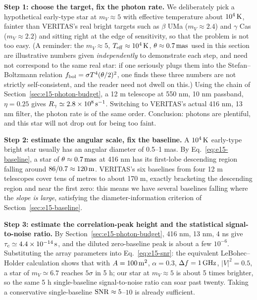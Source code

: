 \textbf{Step 1: choose the target, fix the photon rate.} We deliberately pick a hypothetical early-type star at $m_V\approx5$ with effective temperature about $10^4\,{\rm K}$, fainter than VERITAS's real bright targets such as $\beta$ UMa ($m_V\approx2.4$) and $\gamma$ Cas ($m_V\approx2.2$) and sitting right at the edge of sensitivity, so that the problem is not too easy. (A reminder: the $m_V\approx5$, $T_{\rm eff}\approx10^4\,{\rm K}$, $\theta\approx0.7\,{\rm mas}$ used in this section are illustrative numbers given \emph{independently} to demonstrate each step, and need not correspond to the same real star: if one seriously plugs them into the Stefan--Boltzmann relation $f_{\rm bol}=\sigma T^4(\theta/2)^2$, one finds these three numbers are not strictly self-consistent, and the reader need not dwell on this.) Using the chain of Section~\ref{sec:e15-photon-budget}, a 12 m telescope at 550 nm, 10 nm passband, $\eta=0.25$ gives $R_\gamma\simeq2.8\times10^8\,{\rm s^{-1}}$. Switching to VERITAS's actual 416 nm, 13 nm filter, the photon rate is of the same order. Conclusion: photons are plentiful, and this star will not drop out for being too faint.

\textbf{Step 2: estimate the angular scale, fix the baseline.} A $10^4\,{\rm K}$ early-type bright star usually has an angular diameter of 0.5--1 mas. By Eq.~\eqref{eq:e15-baseline}, a star of $\theta\approx0.7\,{\rm mas}$ at 416 nm has its first-lobe descending region falling around $86/0.7\approx120\,{\rm m}$. VERITAS's six baselines from four 12 m telescopes cover tens of metres to about 170 m, exactly bracketing the descending region and near the first zero: this means we have several baselines falling where the \emph{slope is large}, satisfying the diameter-information criterion of Section~\ref{sec:e15-baseline}.

\textbf{Step 3: estimate the correlation-peak height and the statistical signal-to-noise ratio.} By Section~\ref{sec:e15-photon-budget}, 416 nm, 13 nm, 4 ns give $\tau_c\simeq4.4\times10^{-14}\,{\rm s}$, and the diluted zero-baseline peak is about a few $10^{-6}$. Substituting the array parameters into Eq.~\eqref{eq:e15-snr}: the equivalent LeBohec--Holder calculation shows that with $A=100\,{\rm m^2}$, $\alpha=0.3$, $\Delta f=1\,{\rm GHz}$, $|V|^2=0.5$, a star of $m_V\simeq6.7$ reaches $5\sigma$ in 5 h; our star at $m_V\approx5$ is about 5 times brighter, so the same 5 h single-baseline signal-to-noise ratio can soar past twenty. Taking a conservative single-baseline ${\rm SNR}\approx5$--$10$ is already sufficient.

